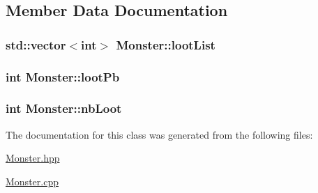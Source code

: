 \subsection{Member Data Documentation}
\hypertarget{classMonster_ab8b7e80d5929a26ef83d409b557ba1c2}{
\subsubsection[{loot\-List}]{\setlength{\rightskip}{0pt plus 5cm}std\-::vector$<$int$>$ Monster\-::loot\-List\hspace{0.3cm}{\ttfamily [protected]}}}\label{classMonster_ab8b7e80d5929a26ef83d409b557ba1c2}
\hypertarget{classMonster_ac9e9bbb454b38bafdd0a252714708d02}{
\subsubsection[{loot\-Pb}]{\setlength{\rightskip}{0pt plus 5cm}int Monster\-::loot\-Pb\hspace{0.3cm}{\ttfamily [protected]}}}\label{classMonster_ac9e9bbb454b38bafdd0a252714708d02}
\hypertarget{classMonster_a4fad5b269c9e61070b7ab149edd7ec0d}{
\subsubsection[{nb\-Loot}]{\setlength{\rightskip}{0pt plus 5cm}int Monster\-::nb\-Loot\hspace{0.3cm}{\ttfamily [protected]}}}\label{classMonster_a4fad5b269c9e61070b7ab149edd7ec0d}


The documentation for this class was generated from the following files\-:\begin{DoxyCompactItemize}
\item 
\hyperlink{Monster_8hpp}{Monster.\-hpp}\item 
\hyperlink{Monster_8cpp}{Monster.\-cpp}\end{DoxyCompactItemize}
